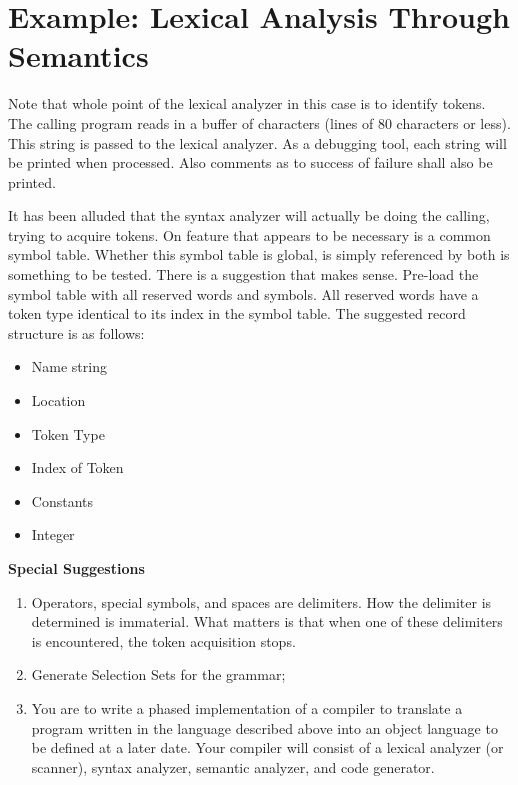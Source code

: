 \section {Example: Lexical Analysis Through Semantics}

Note that whole point of the lexical analyzer in this case is to identify tokens.   The calling program reads in a buffer of characters (lines of 80 characters or less).  This string is passed to the lexical analyzer.  As a debugging tool, each string will be printed when processed.  Also comments as to success of failure shall also be printed.  

It has been alluded that the syntax analyzer will actually be doing the calling, trying to acquire tokens.  On feature that appears to be necessary is a common symbol table.  Whether this symbol table is global, is simply referenced by both is something to be tested.   There is a suggestion that makes sense.  Pre-load the symbol table with all reserved words and symbols.  All reserved words have a token type identical to its index in the symbol table.  The suggested record structure is as follows:
\begin{itemize}
\item Name string
\item Location 
\item Token Type 
\item Index of Token
\item Constants
\item Integer
\end{itemize}
\textbf {\Large Special Suggestions}
\begin{enumerate}
\item Operators, special symbols, and spaces are delimiters.  How the delimiter is determined is immaterial.  What matters is that when one of these delimiters is encountered, the token acquisition stops.  
\item Generate Selection Sets for the grammar;
\item You are to write a phased implementation of a compiler to translate a program written in the language described above into an object language to be defined at a later date.  Your compiler will consist of a lexical analyzer (or scanner), syntax analyzer, semantic analyzer, and code generator.
\end{enumerate}



